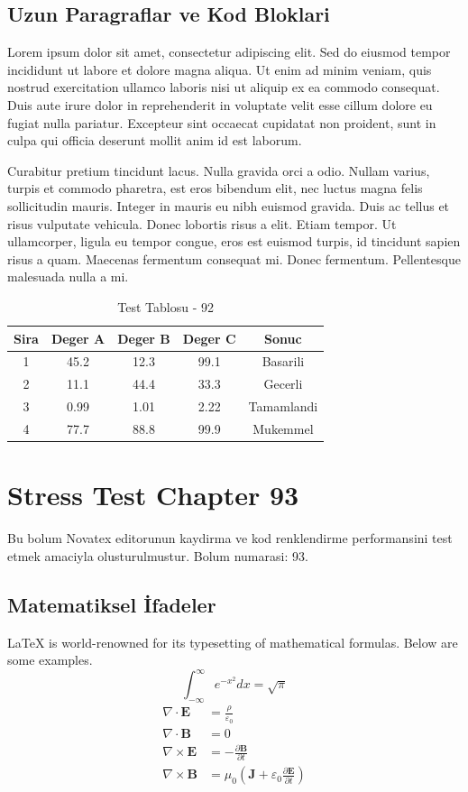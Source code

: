 \documentclass[12pt,a4paper]{article}
\begin{document}
\subsection{Uzun Paragraflar ve Kod Bloklari}
Lorem ipsum dolor sit amet, consectetur adipiscing elit. Sed do eiusmod tempor incididunt ut labore et dolore magna aliqua. Ut enim ad minim veniam, quis nostrud exercitation ullamco laboris nisi ut aliquip ex ea commodo consequat. Duis aute irure dolor in reprehenderit in voluptate velit esse cillum dolore eu fugiat nulla pariatur. Excepteur sint occaecat cupidatat non proident, sunt in culpa qui officia deserunt mollit anim id est laborum.

Curabitur pretium tincidunt lacus. Nulla gravida orci a odio. Nullam varius, turpis et commodo pharetra, est eros bibendum elit, nec luctus magna felis sollicitudin mauris. Integer in mauris eu nibh euismod gravida. Duis ac tellus et risus vulputate vehicula. Donec lobortis risus a elit. Etiam tempor. Ut ullamcorper, ligula eu tempor congue, eros est euismod turpis, id tincidunt sapien risus a quam. Maecenas fermentum consequat mi. Donec fermentum. Pellentesque malesuada nulla a mi.

\begin{table}[h!]
\centering
\begin{tabular}{|c|c|c|c|c|}
\hline
\textbf{Sira} & \textbf{Deger A} & \textbf{Deger B} & \textbf{Deger C} & \textbf{Sonuc} \\
\hline
1 & 45.2 & 12.3 & 99.1 & Basarili \\
2 & 11.1 & 44.4 & 33.3 & Gecerli \\
3 & 0.99 & 1.01 & 2.22 & Tamamlandi \\
4 & 77.7 & 88.8 & 99.9 & Mukemmel \\
\hline
\end{tabular}
\caption{Test Tablosu - 92}
\end{table}

\newpage
\section{Stress Test Chapter 93}
Bu bolum Novatex editorunun kaydirma ve kod renklendirme performansini test etmek amaciyla olusturulmustur. Bolum numarasi: 93.

\subsection{Matematiksel İfadeler}
\LaTeX{} is world-renowned for its typesetting of mathematical formulas. Below are some examples.
\begin{equation}
\int_{-\infty}^{\infty} e^{-x^2} dx = \sqrt{\pi}
\end{equation}
\begin{align}
\nabla \cdot \mathbf{E} &= \frac{\rho}{\varepsilon_0} \\
\nabla \cdot \mathbf{B} &= 0 \\
\nabla \times \mathbf{E} &= -\frac{\partial \mathbf{B}}{\partial t} \\
\nabla \times \mathbf{B} &= \mu_0\left(\mathbf{J} + \varepsilon_0 \frac{\partial \mathbf{E}}{\partial t}\right)
\end{align}
\end{document}
